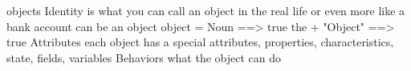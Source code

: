 objects  
  Identity
    is what you can call an object in the real life  or even more like a bank account can be an object
    object = Noun    ==>  true       the + "Object"   ==> true 
  Attributes
    each object has a special attributes, properties, characteristics, state, fields, variables 
  Behaviors 
    what the object can do 
   